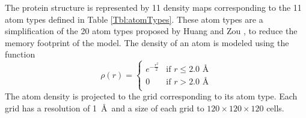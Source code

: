 The protein structure is represented by 11 density maps corresponding
to the 11 atom types defined in Table \ref{Tbl:atomTypes}.
%
These atom types are a simplification of the 20 atom types proposed by
Huang and Zou \cite{huang2006iterative, huang2008iterative}, to reduce
the memory footprint of the model.
%
%
The density of an atom is modeled using the function
\begin{equation}
\label{eq:rho}
\rho(r) =  \begin{cases}
               e^{-\frac{r^2}{2}}&\text{if } r\leq 2.0\text{ \AA} \\
               0                 &\text{if } r>2.0\text{ \AA} \\
            \end{cases}
\end{equation}
The atom density is projected to the grid corresponding to its atom
type. Each grid has a resolution of 1~\AA\ and a size of each grid to
$120\times 120\times 120$ cells.

